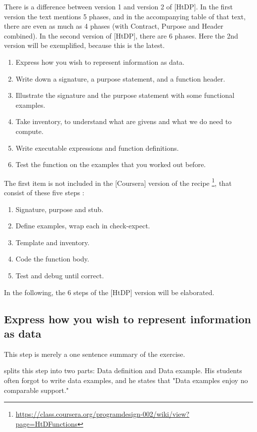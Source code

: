 There is a difference between version 1 and version 2 of [HtDP].
In the first version the text mentions 5 phases, and in the accompanying table
of that text, there are even as much as 4 phases (with Contract, Purpose and Header combined).
In the second version of [HtDP], there are 6 phases.
Here the 2nd version will be exemplified, because this is the latest.

\begin{enumerate}
 \item Express how you wish to represent information as data.
 \item Write down a signature, a purpose statement, and a function header.
 \item Illustrate the signature and the purpose statement with some functional examples.
 \item Take inventory, to understand what are givens and what we do need to compute.
 \item Write executable expressions and function definitions.
 \item Test the function on the examples that you worked out before.
\end{enumerate}
 
 The first item is not included in the [Coursera] version of the recipe \footnote{\url{https://class.coursera.org/programdesign-002/wiki/view?page=HtDFunctions}}, that consist of these five steps :
 
\begin{enumerate}
  \item Signature, purpose and stub.
  \item Define examples, wrap each in check-expect.
  \item Template and inventory.
  \item Code the function body.
  \item Test and debug until correct.
\end{enumerate}

In the following, the 6 steps of the [HtDP] version will be elaborated.



\subsection{Express how you wish to represent information as data}
This step is merely a one sentence summary of the exercise.

\citep{ramsey_teaching_2015} splits this step into two parts: Data definition
and Data example. His students often forgot to write data examples, and he states that
"Data examples enjoy no comparable support."

